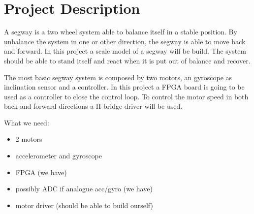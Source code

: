 \section*{Project Description}

A segway is a two wheel system able to balance itself in a stable position. 
By unbalance the system in one or other direction, the segway is able to move back and forward.
In this project a scale model of a segway will be build.
The system should be able to stand itself and react when it is put out of balance and recover.

The most basic segway system is composed by two motors, an gyroscope as inclination sensor and a controller.
In this project a FPGA board is going to be used as a controller to close the control loop.
To control the motor speed in both back and forward directions a H-bridge driver will be used.



What we need:

\begin{itemize}
\item 2 motors
\item accelerometer and gyroscope
\item FPGA (we have)
\item possibly ADC if analogue acc/gyro (we have)
\item motor driver (should be able to build ourself)
\end{itemize}
